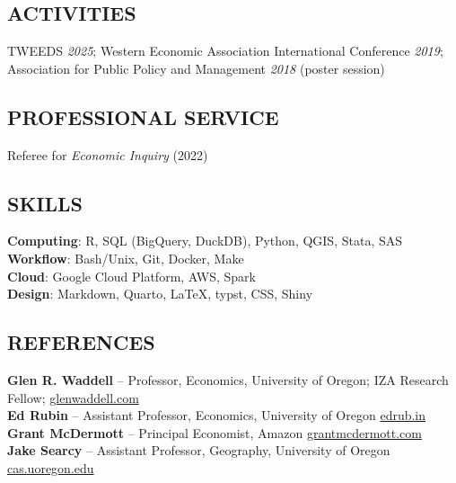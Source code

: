 \documentclass[11pt]{article}
\begin{document}

\subsection*{ACTIVITIES}

TWEEDS \textit{2025}; Western Economic Association International Conference \textit{2019}; Association for Public Policy and Management \textit{2018} (poster session)


\subsection*{PROFESSIONAL SERVICE}
Referee for \textit{Economic Inquiry} (2022)


\subsection*{SKILLS}
\textbf{Computing}: R, SQL (BigQuery, DuckDB), Python, QGIS, Stata, SAS \\
\textbf{Workflow}: Bash/Unix, Git, Docker, Make \\
\textbf{Cloud}: Google Cloud Platform, AWS, Spark \\
\textbf{Design}: Markdown, Quarto, {\charter\LaTeX}, typst, CSS, Shiny \\


\subsection*{REFERENCES}
\textbf{Glen R. Waddell} -- Professor, Economics, University of Oregon; IZA Research Fellow; \href{https://glenwaddell.com}{glenwaddell.com} \\
\textbf{Ed Rubin} -- Assistant Professor, Economics, University of Oregon \href{https://edrub.in}{edrub.in} \\
\textbf{Grant McDermott} -- Principal Economist, Amazon \href{https://grantmcdermott.com/}{grantmcdermott.com} \\
\textbf{Jake Searcy} -- Assistant Professor, Geography, University of Oregon \href{https://cas.uoregon.edu/directory/computer-and-data-sciences/all/jsearcy}{cas.uoregon.edu} \\
\end{document}
